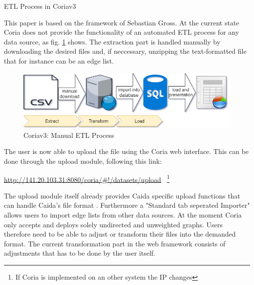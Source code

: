 \documentclass[conference, 11pt]{IEEEtran}
\begin{document}
\begin{subsection}{ETL Process in Coriav3}

This paper is based on the framework of Sebastian Gross\cite{Coria3}. At the current state Coria does not provide the functionality of an automated ETL process for any data source, as fig. \ref{fig:ETLinCoriav3} shows. 
The extraction part is handled manually by downloading the desired files and, if neccessary, unzipping the text-formatted file that for instance can be an edge list. \\ \linebreak


\vspace{0.3cm}
\begin{figure}[htbp]
\centerline{\includegraphics[width=\columnwidth]{Graphics/CoriaETL_current.png}}
\caption{Coriav3: Manual ETL Process}
\label{fig:ETLinCoriav3}
\end{figure}
\vspace{0.3cm}

The user is now able to upload the file using the Coria web interface. This can be done through the upload module, following this link: \begin{center} \url{http://141.20.103.31:8080/coria/#!/datasets/upload}  ~\footnote{If Coria is implemented on an other system the IP changes}\end{center} The upload module itself already provides Caida specific upload functions that can handle Caida's file format \cite{Coria3}. Furthermore a "Standard tab seperated Importer" allows users to import edge lists from other data sources. At the moment Coria only accepts and deploys solely undirected and unweighted graphs. Users therefore need to be able to adjust or transform their files into the demanded format. The current transformation part in the web framework consists of adjustments that has to be done by the user itself.\linebreak


\end{subsection}
\end{document}
